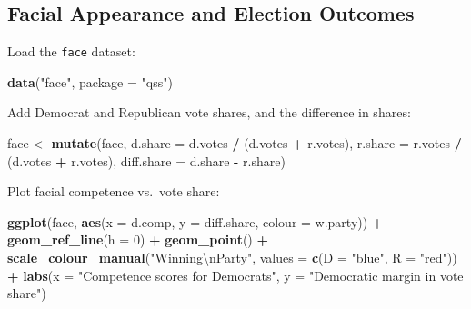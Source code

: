 \documentclass[]{book}
\newenvironment{Shaded}{\begin{snugshade}}{\end{snugshade}}
\newcommand{\KeywordTok}[1]{\textcolor[rgb]{0.13,0.29,0.53}{\textbf{#1}}}
\newcommand{\DataTypeTok}[1]{\textcolor[rgb]{0.13,0.29,0.53}{#1}}
\newcommand{\DecValTok}[1]{\textcolor[rgb]{0.00,0.00,0.81}{#1}}
\newcommand{\CharTok}[1]{\textcolor[rgb]{0.31,0.60,0.02}{#1}}
\newcommand{\StringTok}[1]{\textcolor[rgb]{0.31,0.60,0.02}{#1}}
\newcommand{\OperatorTok}[1]{\textcolor[rgb]{0.81,0.36,0.00}{\textbf{#1}}}
\newcommand{\NormalTok}[1]{#1}
\theoremstyle{definition}
\theoremstyle{definition}
\theoremstyle{definition}
\theoremstyle{remark}
\begin{document}
\subsection{Facial Appearance and Election
Outcomes}\label{facial-appearance-and-election-outcomes}

Load the \texttt{face} dataset:

\begin{Shaded}
\begin{Highlighting}[]
\KeywordTok{data}\NormalTok{(}\StringTok{"face"}\NormalTok{, }\DataTypeTok{package =} \StringTok{"qss"}\NormalTok{)}
\end{Highlighting}
\end{Shaded}

Add Democrat and Republican vote shares, and the difference in shares:

\begin{Shaded}
\begin{Highlighting}[]
\NormalTok{face <-}\StringTok{ }\KeywordTok{mutate}\NormalTok{(face,}
                \DataTypeTok{d.share =}\NormalTok{ d.votes }\OperatorTok{/}\StringTok{ }\NormalTok{(d.votes }\OperatorTok{+}\StringTok{ }\NormalTok{r.votes),}
                \DataTypeTok{r.share =}\NormalTok{ r.votes }\OperatorTok{/}\StringTok{ }\NormalTok{(d.votes }\OperatorTok{+}\StringTok{ }\NormalTok{r.votes),}
                \DataTypeTok{diff.share =}\NormalTok{ d.share }\OperatorTok{-}\StringTok{ }\NormalTok{r.share)}
\end{Highlighting}
\end{Shaded}

Plot facial competence vs.~vote share:

\begin{Shaded}
\begin{Highlighting}[]
\KeywordTok{ggplot}\NormalTok{(face, }\KeywordTok{aes}\NormalTok{(}\DataTypeTok{x =}\NormalTok{ d.comp, }\DataTypeTok{y =}\NormalTok{ diff.share, }\DataTypeTok{colour =}\NormalTok{ w.party)) }\OperatorTok{+}
\StringTok{  }\KeywordTok{geom_ref_line}\NormalTok{(}\DataTypeTok{h =} \DecValTok{0}\NormalTok{) }\OperatorTok{+}
\StringTok{  }\KeywordTok{geom_point}\NormalTok{() }\OperatorTok{+}
\StringTok{  }\KeywordTok{scale_colour_manual}\NormalTok{(}\StringTok{"Winning}\CharTok{\textbackslash{}n}\StringTok{Party"}\NormalTok{,}
                      \DataTypeTok{values =} \KeywordTok{c}\NormalTok{(}\DataTypeTok{D =} \StringTok{"blue"}\NormalTok{, }\DataTypeTok{R =} \StringTok{"red"}\NormalTok{)) }\OperatorTok{+}
\StringTok{  }\KeywordTok{labs}\NormalTok{(}\DataTypeTok{x =} \StringTok{"Competence scores for Democrats"}\NormalTok{,}
       \DataTypeTok{y =} \StringTok{"Democratic margin in vote share"}\NormalTok{)}
\end{Highlighting}
\end{Shaded}
\end{document}
